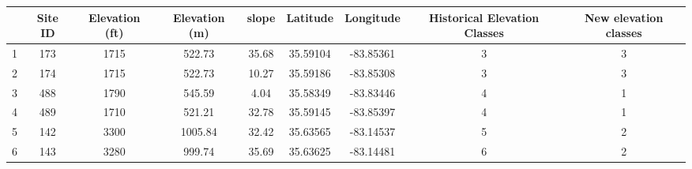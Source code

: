 \begin{table}[p]\footnotesize
\begin{flushleft}
\begin{tabular}{ccccccccc}
\toprule
    & \multicolumn{ 1}{p{1cm}}{Site ID} & \multicolumn{ 1}{p{2cm}}{Elevation (ft)} & \multicolumn{ 1}{p{2cm}}{Elevation (m)} & slope & Latitude   & Longitude  & \multicolumn{ 1}{p{2cm}}{Historical Elevation Classes} & \multicolumn{ 1}{p{2cm}}{New elevation classes} \\  
\midrule
1   & 173                                                 & 1715                                                          & 522.73                                                       & 35.68 & 35.59104 & -83.85361 & 3                                                                                      & 3 \\ 
2   & 174                                                 & 1715                                                          & 522.73                                                       & 10.27 & 35.59186 & -83.85308 & 3                                                                                      & 3 \\ 
3   & 488                                                 & 1790                                                          & 545.59                                                       & 4.04   & 35.58349 & -83.83446 & 4                                                                                      & 1 \\ 
4   & 489                                                 & 1710                                                          & 521.21                                                       & 32.78 & 35.59145 & -83.85397 & 4                                                                                      & 1 \\ 
5   & 142                                                 & 3300                                                          & 1005.84                                                     & 32.42 & 35.63565 & -83.14537 & 5                                                                                      & 2 \\ 
6   & 143                                                 & 3280                                                          & 999.74                                                       & 35.69 & 35.63625 & -83.14481 & 6                                                                                      & 2 \\ 

\end{tabular}
\end{flushleft}
\end{table}
